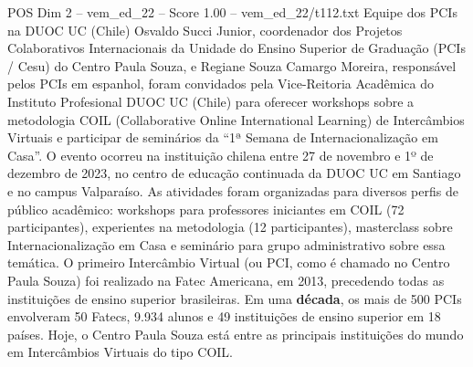 \begin{textsample}{POS Dim 2 – vem\_ed\_22 – Score 1.00 – vem\_ed\_22/t112.txt}  \label{ex:f2_pos_183}
Equipe dos PCIs na DUOC UC (Chile) Osvaldo Succi Junior, coordenador dos Projetos Colaborativos Internacionais da Unidade do Ensino Superior de Graduação (PCIs / Cesu) do Centro Paula Souza, e Regiane Souza Camargo Moreira, responsável pelos PCIs em espanhol, foram convidados pela Vice-Reitoria Acadêmica do Instituto Profesional DUOC UC (Chile) para oferecer workshops sobre a metodologia COIL (Collaborative Online International Learning) de Intercâmbios Virtuais e participar de seminários da “1ª Semana de Internacionalização em Casa”.
O evento ocorreu na instituição chilena entre 27 de novembro e 1º de dezembro de 2023, no centro de educação continuada da DUOC UC em Santiago e no campus Valparaíso.
As atividades foram organizadas para diversos perfis de público acadêmico: workshops para professores iniciantes em COIL (72 participantes), experientes na metodologia (12 participantes), masterclass sobre Internacionalização em Casa e seminário para grupo administrativo sobre essa temática.
O primeiro Intercâmbio Virtual (ou PCI, como é chamado no Centro Paula Souza) foi realizado na Fatec Americana, em 2013, precedendo todas as instituições de ensino superior brasileiras.
Em uma \textbf{década}, os mais de 500 PCIs envolveram 50 Fatecs, 9.934 alunos e 49 instituições de ensino superior em 18 países.
Hoje, o Centro Paula Souza está entre as principais instituições do mundo em Intercâmbios Virtuais do tipo COIL.

\end{textsample}
